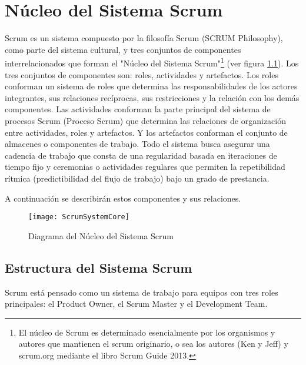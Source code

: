 
\chapter{Núcleo del Sistema Scrum}

Scrum es un sistema compuesto por la filosofía Scrum (SCRUM Philosophy), como parte del sistema cultural, y tres conjuntos de componentes interrelacionados que forman el "Núcleo del Sistema Scrum"\footnote{El núcleo de Scrum es determinado esencialmente por los organismos y autores que mantienen el scrum originario, o sea los autores (Ken y Jeff) y scrum.org mediante el libro Scrum Guide 2013\cite{Ken-Jeff-2013}.} (ver figura \ref{fig:ScrumSystemCore}). Los tres conjuntos de componentes son: roles, actividades y artefactos. Los roles conforman un sistema de roles que determina las responsabilidades de los actores integrantes, sus relaciones recíprocas, sus restricciones y la relación con los demás componentes. Las actividades conforman la parte principal del sistema de procesos Scrum (Proceso Scrum) que determina las relaciones de organización entre actividades, roles y artefactos. Y los artefactos conforman el conjunto de almacenes o componentes de trabajo. Todo el sistema busca asegurar una cadencia de trabajo que consta de una regularidad basada en iteraciones de tiempo fijo y ceremonias o actividades regulares que permiten la repetibilidad rítmica (predictibilidad del flujo de trabajo) bajo un grado de prestancia.

\newpage
A continuación se describirán estos componentes y sus relaciones.

\begin{figure}[h]
  \centering
  \texttt{[image: ScrumSystemCore]}
  \caption{Diagrama del Núcleo del Sistema Scrum}
  \centering
  \label{fig:ScrumSystemCore} %
\end{figure}
\FloatBarrier %

\section{Estructura del Sistema Scrum}

Scrum está pensado como un sistema de trabajo para equipos con tres roles principales: el Product Owner, el Scrum Master y el Development Team. 

